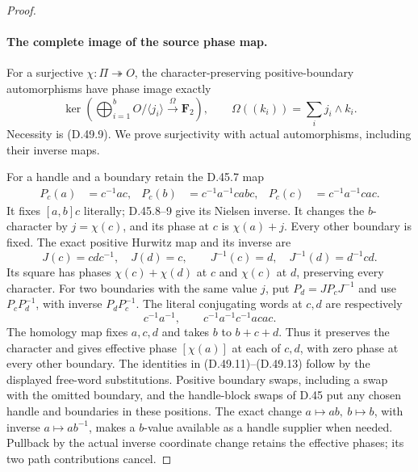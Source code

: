 \begin{proof}
\paragraph{The complete image of the source phase map.}
For a surjective \(\chi:\Pi\twoheadrightarrow O\), the character-preserving
positive-boundary automorphisms have phase image exactly
\[
 \ker\left(
       \bigoplus_{i=1}^b O/\langle j_i\rangle
          \xrightarrow{\ \Omega\ }\mathbf F_2\right),
 \qquad \Omega((k_i))=\sum_i j_i\wedge k_i.
 \tag{D.49.10}
\]
Necessity is \textup{(D.49.9)}. We prove surjectivity with actual
automorphisms, including their inverse maps.

For a handle and a boundary retain the D.45.7 map
\[
 \begin{aligned}
 P_c(a)&=c^{-1}ac,&
 P_c(b)&=c^{-1}a^{-1}cab c,&
 P_c(c)&=c^{-1}a^{-1}cac.
 \end{aligned}
 \tag{D.49.11}
\]
It fixes \([a,b]c\) literally; D.45.8--9 give its Nielsen inverse.
It changes the \(b\)-character by \(j=\chi(c)\), and its phase at
\(c\) is \(\chi(a)+j\). Every other boundary is fixed.
The exact positive Hurwitz map and its inverse are
\[
 J(c)=cdc^{-1},\quad J(d)=c,
 \qquad J^{-1}(c)=d,\quad J^{-1}(d)=d^{-1}cd.
 \tag{D.49.12}
\]
Its square has phases \(\chi(c)+\chi(d)\) at \(c\) and
\(\chi(c)\) at \(d\), preserving every character.
For two boundaries with the same value \(j\), put
\(P_d=JP_cJ^{-1}\) and use
\(P_cP_d^{-1}\), with inverse \(P_dP_c^{-1}\).
The literal conjugating words at \(c,d\) are respectively
\[
 c^{-1}a^{-1},\qquad
 c^{-1}a^{-1}c^{-1}acac.
 \tag{D.49.13}
\]
The homology map fixes \(a,c,d\) and takes \(b\) to \(b+c+d\).
Thus it preserves the character and gives effective phase
\([\chi(a)]\) at each of \(c,d\), with zero phase at every other
boundary. The identities in \textup{(D.49.11)--(D.49.13)} follow by
the displayed free-word substitutions. Positive boundary swaps,
including a swap with the omitted boundary, and the handle-block swaps
of D.45 put any chosen handle and boundaries in these positions.
The exact change \(a\mapsto ab,\ b\mapsto b\), with inverse
\(a\mapsto ab^{-1}\), makes a \(b\)-value available as a handle
supplier when needed. Pullback by the actual inverse coordinate change
retains the effective phases; its two path contributions cancel.


\end{proof}
